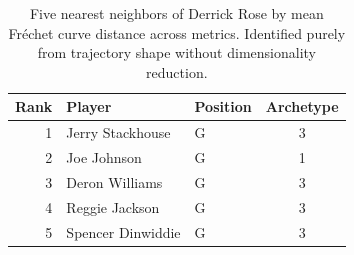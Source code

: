 \begin{table}[htbp]
  \centering\small
  \begin{tabular}{rllc}
    \toprule
    Rank & Player & Position & Archetype \\
    \midrule
    1 & Jerry Stackhouse & G & 3 \\
    2 & Joe Johnson & G & 1 \\
    3 & Deron Williams & G & 3 \\
    4 & Reggie Jackson & G & 3 \\
    5 & Spencer Dinwiddie & G & 3 \\
    \bottomrule
  \end{tabular}
  \caption{Five nearest neighbors of Derrick Rose by mean Fr\'{e}chet curve distance across metrics. Identified purely from trajectory shape without dimensionality reduction.}
  \label{tab:Derrick_Rose_frechet_curve_neighbors}
\end{table}

